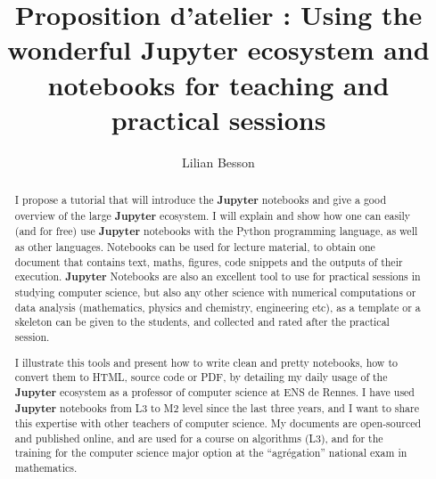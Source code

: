 \documentclass[runningheads]{llncs}
\newcommand{\Jupyter}{\textbf{Jupyter}}
\begin{document}
%
\title{Proposition d'atelier : Using the wonderful \Jupyter{} ecosystem and notebooks for teaching and practical sessions}
%
\titlerunning{Introduction to \Jupyter{} notebooks}
%
\author{Lilian Besson}
%
%
%
\maketitle              %
%
\begin{abstract}

    I propose a tutorial that will introduce the \Jupyter{} notebooks and give a good overview of the large \Jupyter{} ecosystem.
    I will explain and show how one can easily (and for free) use \Jupyter{} notebooks with the Python programming language, as well as other languages.
    Notebooks can be used for lecture material, to obtain one document that contains text, maths, figures, code snippets and the outputs of their execution.
    \Jupyter{} Notebooks are also an excellent tool to use for practical sessions in studying computer science, but also any other science with numerical computations or data analysis (mathematics, physics and chemistry, engineering etc), as a template or a skeleton can be given to the students, and collected and rated after the practical session.

    I illustrate this tools and present how to write clean and pretty notebooks, how to convert them to HTML, source code or PDF, by detailing my daily usage of the \Jupyter{} ecosystem as a professor of computer science at ENS de Rennes.
    I have used \Jupyter{} notebooks from L3 to M2 level since the last three years, and I want to share this expertise with other teachers of computer science.
    My documents are open-sourced and published online, and are used for a course on algorithms (L3), and for the training for the computer science major option at the ``agr{\'e}gation'' national exam in mathematics.


\end{abstract}
%
%
%
\end{document}

